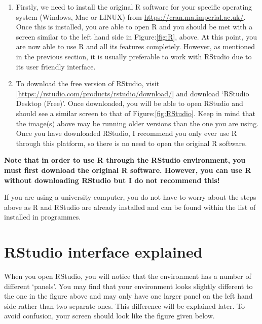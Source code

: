 \documentclass[
]{book}
\theoremstyle{definition}
\theoremstyle{definition}
\theoremstyle{definition}
\theoremstyle{definition}
\theoremstyle{remark}
\begin{document}
\begin{enumerate}
\def\labelenumi{\arabic{enumi}.}
\item
  Firstly, we need to install the original R software for your specific operating system (Windows, Mac or LINUX) from \url{https://cran.ma.imperial.ac.uk/}. Once this is installed, you are able to open R and you should be met with a screen similar to the left hand side in Figure:\ref{fig:R}, above. At this point, you are now able to use R and all its features completely. However, as mentioned in the previous section, it is usually preferable to work with RStudio due to its user friendly interface.
\item
  To download the free version of RStudio, visit {[}\url{https://rstudio.com/products/rstudio/download/}{]} and download `RStudio Desktop (Free)'. Once downloaded, you will be able to open RStudio and should see a similar screen to that of Figure:\ref{fig:RStudio}. Keep in mind that the image(s) above may be running older versions than the one you are using. Once you have downloaded RStudio, I recommend you only ever use R through this platform, so there is no need to open the original R software.
\end{enumerate}

\textbf{Note that in order to use R through the RStudio environment, you must first download the original R software. However, you can use R without downloading RStudio but I do not recommend this!}

If you are using a university computer, you do not have to worry about the steps above as R and RStudio are already installed and can be found within the list of installed in programmes.

\hypertarget{rstudio-interface-explained}{%
\section{RStudio interface explained}\label{rstudio-interface-explained}}

When you open RStudio, you will notice that the environment has a number of different `panels'. You may find that your environment looks slightly different to the one in the figure above and may only have one larger panel on the left hand side rather than two separate ones. This difference will be explained later. To avoid confusion, your screen should look like the figure given below.
\end{document}
